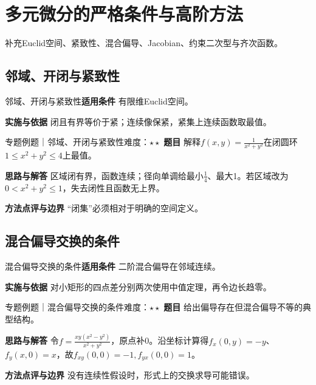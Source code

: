 \section{多元微分的严格条件与高阶方法}\label{mat:multivariable}
\begin{examtip}补充Euclid空间、紧致性、混合偏导、Jacobian、约束二次型与齐次函数。\end{examtip}
\subsection{邻域、开闭与紧致性}\label{mat:multivariable:topology}
\begin{method}{邻域、开闭与紧致性}\textbf{适用条件} 有限维Euclid空间。\par\textbf{实施与依据} 闭且有界等价于紧；连续像保紧，紧集上连续函数取最值。\end{method}
\begin{example}{专题例题｜邻域、开闭与紧致性}{难度：$\star\star$}
\textbf{题目} 解释$f(x,y)=\frac{1}{x^2+y^2}$在闭圆环$1\le x^2+y^2\le4$上最值。\par\textbf{思路与解答} 区域闭有界，函数连续；径向单调给最小$\frac{1}{4}$、最大1。若区域改为$0<x^2+y^2\le1$，失去闭性且函数无上界。\par\textbf{方法点评与边界} “闭集”必须相对于明确的空间定义。
\end{example}
\subsection{混合偏导交换的条件}\label{mat:multivariable:mixed}
\begin{method}{混合偏导交换的条件}\textbf{适用条件} 二阶混合偏导在邻域连续。\par\textbf{实施与依据} 对小矩形的四点差分别两次使用中值定理，再令边长趋零。\end{method}
\begin{example}{专题例题｜混合偏导交换的条件}{难度：$\star\star$}
\textbf{题目} 给出偏导存在但混合偏导不等的典型结构。\par\textbf{思路与解答} 令$f=\frac{xy(x^2-y^2)}{x^2+y^2}$，原点补0。沿坐标计算得$f_x(0,y)=-y$、$f_y(x,0)=x$，故$f_{xy}(0,0)=-1,f_{yx}(0,0)=1$。\par\textbf{方法点评与边界} 没有连续性假设时，形式上的交换求导可能错误。
\end{example}
